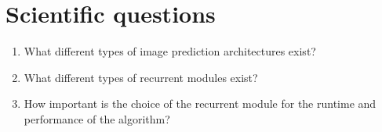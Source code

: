 \section{Scientific questions}
 \begin{enumerate}
  \item What different types of image prediction architectures exist?
  \item What different types of recurrent modules exist?
  \item How important is the choice of the recurrent module for the runtime and performance of the algorithm?
 \end{enumerate}